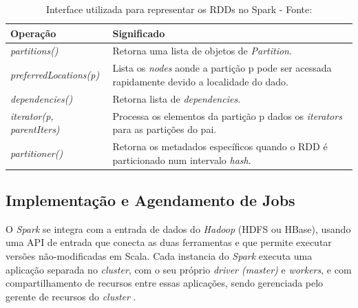             \begin{table}[!ht]
            \begin{center}
              \begin{tabular}{|p{5cm}|p{8cm}|}
                \hline
                Operação & Significado
                \\ \hline
                \textit{partitions()} & Retorna uma lista de objetos de \textit{Partition}.
                \\ \hline
                \textit{preferredLocations(p)} & Lista os \textit{nodes} aonde a partição p pode ser acessada rapidamente
                                                                     devido a localidade do dado.
                \\ \hline
                \textit{dependencies()} & Retorna lista de \textit{dependencies}.
                \\ \hline
                \textit{iterator(p, parentIters)} & Processa os elementos da partição p dados os \textit{iterators} para
                                                                       as partições do pai.
                \\ \hline
                \textit{partitioner()} & Retorna os metadados específicos quando o RDD é particionado num intervalo \textit{hash}.
                \\ \hline
              \end{tabular}
              \caption[Interface utilizada para representar os RDDs no Spark]{Interface utilizada para representar os RDDs no Spark -
              \protect Fonte: }
            \label{tabela3}
            \end{center}
            \end{table}

        \subsection{Implementação e Agendamento de Jobs}

            O \textit{Spark} se integra com a entrada de dados do \textit{Hadoop} (HDFS ou HBase), usando uma API de entrada
            que conecta as duas ferramentas e que permite executar versões não-modificadas em Scala. Cada instancia do
            \textit{Spark} executa uma aplicação separada no \textit{cluster}, com o seu próprio \textit{driver (master)} e
            \textit{workers}, e com compartilhamento de recursos entre essas aplicações, sendo gerenciada pelo gerente de
            recursos do \textit{cluster} \cite{white2015}.

